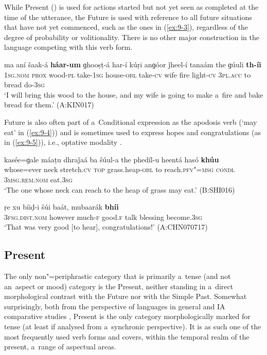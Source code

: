 While Present () is used for actions started but not yet seen as completed at the time of the utterance, the Future is used with reference to all future situations that have not yet commenced, such as the ones in (\ref{ex:9-3}), regardless of the degree of probability or volitionality. There is no other major construction in the language competing with this verb form.

\begin{exe}
\ex
\label{ex:9-3}
\gll ma aní šaak-á \textbf{háar-um} ɡhooṣṭ-á har-í kúṛi anɡóor ǰheel-í tanaám the ɡúuli \textbf{th-íi}\\
\textsc{1sg.nom} \textsc{prox} wood-\textsc{pl} take-\textsc{1sg} house-\textsc{obl} take-\textsc{cv} wife fire light-\textsc{cv} \textsc{3pl.acc} to bread do-\textsc{3sg}\\
\glt `I will bring this wood to the house, and my wife is going to make a~fire and bake bread for
them.' (A:KIN017)
\end{exe}

Future is also often part of a~Conditional expression as the apodosis verb (`may eat' in (\ref{ex:9-4})) and is sometimes used to express hopes and congratulations (as in (\ref{ex:9-5})), i.e., optative modality \citep[179]{bybeeetal1994}.

\begin{exe}
\ex
\label{ex:9-4}
\gll kasée=ɡale máaṭu dhraǰaá ba šúul-a the phedíl-u heentá hasó \textbf{khúu} \\
whose=ever neck stretch.\textsc{cv} \textsc{top} grass.heap-\textsc{obl}  to reach.\textsc{pfv"=msg } \textsc{condl} \textsc{3msg.rem.nom} eat.\textsc{3sg} \\
\glt `The one whose neck can reach to the heap of grass may eat.' (B:SHI016)

\ex
\label{ex:9-5}
\gll ṛe xu bíiḍ-i šúi baát, mubaarák \textbf{bhíi} \\
\textsc{3fsg.dist.nom} however much-\textsc{f} good.\textsc{f} talk blessing  become.\textsc{3sg} \\
\glt `That was very good [to hear], congratulations!' (A:CHN070717)
\end{exe}

\subsection{Present}
\label{subsec:9-1-3}

The only non"=periphrastic category that is primarily a~tense (and not an~aspect or mood) category is the Present, neither standing in a~direct morphological contrast with the Future nor with the Simple Past. Somewhat surprisingly, both from the perspective of languages in general \citep[103--128]{dahl1985} and IA comparative studies \citep[282, 288--289]{masica1991}, Present is the only category morphologically marked for tense (at least if analysed from a~synchronic perspective). It is as such one of the most frequently used verb forms and covers, within the temporal realm of the present, a~range of aspectual areas. 




